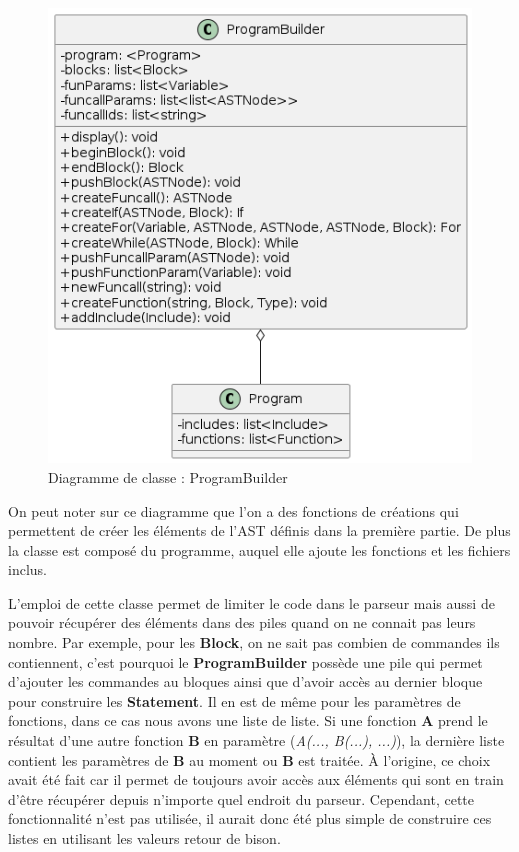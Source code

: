 \documentclass[a4paper]{article}%
\begin{document}
\begin{figure}[h]
  \begin{center}
  \includegraphics[scale=0.5]{../ressources/diagrams/program-builder.png}
  \caption{Diagramme de classe : ProgramBuilder}
  \end{center}
\end{figure}

On peut noter sur ce diagramme que l'on a des fonctions de créations qui
permettent de créer les éléments de l'AST définis dans la première partie. De
plus la classe est composé du programme, auquel elle ajoute les fonctions et les
fichiers inclus. %

L'emploi de cette classe permet de limiter le code dans le parseur mais aussi de
pouvoir récupérer des éléments dans des piles quand on ne connait pas leurs
nombre. Par exemple, pour les \textbf{Block}, on ne sait pas combien de
commandes ils contiennent, c'est pourquoi le \textbf{ProgramBuilder} possède une
pile qui permet d'ajouter les commandes au bloques ainsi que d'avoir accès au
dernier bloque pour construire les \textbf{Statement}. Il en est de même pour
les paramètres de fonctions, dans ce cas nous avons une liste de liste. Si une
fonction \textbf{A} prend le résultat d'une autre fonction \textbf{B} en
paramètre (\textit{A(..., B(...), ...)}), la dernière liste contient les
paramètres de \textbf{B} au moment ou \textbf{B} est traitée. À l'origine, ce
choix avait été fait car il permet de toujours avoir accès aux éléments qui sont
en train d'être récupérer depuis n'importe quel endroit du parseur. Cependant,
cette fonctionnalité n'est pas utilisée, il aurait donc été plus simple de
construire ces listes en utilisant les valeurs retour de bison.\\
\end{document}
